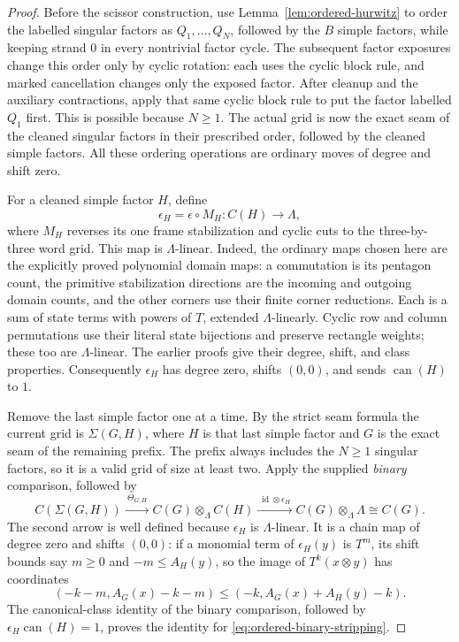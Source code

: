 \documentclass[11pt,a4paper]{article}
\theoremstyle{remark}
\begin{document}
\begin{proof}
Before the scissor construction, use
Lemma~\ref{lem:ordered-hurwitz} to order the labelled singular factors
as $Q_1,\ldots,Q_N$, followed by the $B$ simple factors, while keeping
strand $0$ in every nontrivial factor cycle.  The subsequent factor
exposures change this order only by cyclic rotation: each uses the
cyclic block rule, and marked cancellation changes only the exposed
factor.  After cleanup and the auxiliary contractions, apply that same
cyclic block rule to put the factor labelled $Q_1$ first.  This is
possible because $N\ge1$.  The actual grid is now the exact seam of
the cleaned singular factors in their prescribed order, followed by
the cleaned simple factors.  All these ordering operations are
ordinary moves of degree and shift zero.

For a cleaned simple factor $H$, define
\[
 \epsilon_H=\epsilon\circ M_H:C(H)\longrightarrow\Lambda,
\]
where $M_H$ reverses its one frame stabilization and cyclic cuts to
the three-by-three word grid.  This map is $\Lambda$-linear.  Indeed,
the ordinary maps chosen here are the explicitly proved polynomial
domain maps: a commutation is its pentagon count, the primitive
stabilization directions are the incoming and outgoing domain counts,
and the other corners use their finite corner reductions.  Each is a
sum of state terms with powers of $T$, extended $\Lambda$-linearly.
Cyclic row and column permutations use their literal state bijections
and preserve rectangle weights; these too are $\Lambda$-linear.
The earlier proofs give their degree, shift, and class properties.
Consequently $\epsilon_H$ has degree zero, shifts $(0,0)$, and sends
$\operatorname{can}(H)$ to $1$.

Remove the last simple factor one at a time.  By the strict seam
formula the current grid is $\Sigma(G,H)$, where $H$ is that last
simple factor and $G$ is the exact seam of the remaining prefix.
The prefix always includes the $N\ge1$ singular factors, so it is a
valid grid of size at least two.  Apply the supplied \emph{binary}
comparison, followed by
\begin{equation}\label{eq:ordered-binary-stripping}
 C(\Sigma(G,H))\xrightarrow{\ \Theta_{G,H}\ }
 C(G)\otimes_\Lambda C(H)
 \xrightarrow{\ \operatorname{id}\otimes\epsilon_H\ }
 C(G)\otimes_\Lambda\Lambda\cong C(G).
\end{equation}
The second arrow is well defined because $\epsilon_H$ is
$\Lambda$-linear.  It is a chain map of degree zero and shifts
$(0,0)$: if a monomial term of $\epsilon_H(y)$ is $T^m$, its shift
bounds say $m\ge0$ and $-m\le A_H(y)$, so the image of
$T^k(x\otimes y)$ has coordinates
\[
 (-k-m,A_G(x)-k-m)
 \le (-k,A_G(x)+A_H(y)-k).
\]
The canonical-class identity of the binary comparison, followed by
$\epsilon_H\operatorname{can}(H)=1$, proves the identity for
\eqref{eq:ordered-binary-stripping}.


\end{proof}
\end{document}
